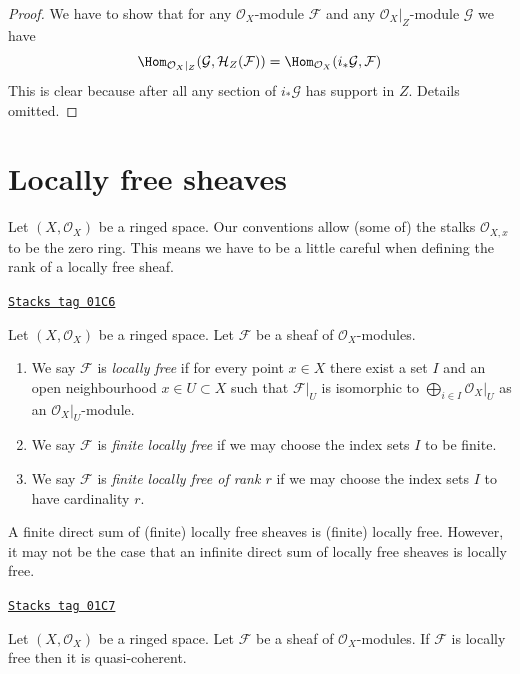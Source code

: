 \begin{proof}
We have to show that for any $\mathcal{O}_X$-module $\mathcal{F}$
and any $\mathcal{O}_X|_Z$-module $\mathcal{G}$ we have
$$
\Hom_{\mathcal{O}_X|_Z}(\mathcal{G}, \mathcal{H}_Z(\mathcal{F})) =
\Hom_{\mathcal{O}_X}(i_*\mathcal{G}, \mathcal{F})
$$
This is clear
because after all any section of $i_*\mathcal{G}$ has support in $Z$.
Details omitted.
\end{proof}

\section{Locally free sheaves}
\label{modules-section-locally-free}
Let $(X, \mathcal{O}_X)$ be a ringed space.
Our conventions allow (some of) the stalks $\mathcal{O}_{X, x}$
to be the zero ring. This means we have to be a little careful
when defining the rank of a locally free sheaf.

\begin{definition}
\label{modules-definition-locally-free}
\href{https://stacks.math.columbia.edu/tag/01C6}{\texttt{Stacks tag 01C6}}

Let $(X, \mathcal{O}_X)$ be a ringed space.
Let $\mathcal{F}$ be a sheaf of $\mathcal{O}_X$-modules.
\begin{enumerate}
\item We say $\mathcal{F}$ is {\it locally free} if for every
point $x \in X$ there exist a set $I$ and an open
neighbourhood $x \in U \subset X$
such that $\mathcal{F}|_U$ is isomorphic to
$\bigoplus_{i \in I} \mathcal{O}_X|_U$ as an $\mathcal{O}_X|_U$-module.
\item We say $\mathcal{F}$ is {\it finite locally free} if we may
choose the index sets $I$ to be finite.
\item We say $\mathcal{F}$ is {\it finite locally free of rank $r$}
if we may choose the index sets $I$ to have cardinality $r$.
\end{enumerate}
\end{definition}

A finite direct sum of (finite) locally free sheaves is (finite)
locally free. However, it may not be the case that an infinite direct
sum of locally free sheaves is locally free.

\begin{lemma}
\label{modules-lemma-locally-free-quasi-coherent}
\href{https://stacks.math.columbia.edu/tag/01C7}{\texttt{Stacks tag 01C7}}

Let $(X, \mathcal{O}_X)$ be a ringed space.
Let $\mathcal{F}$ be a sheaf of $\mathcal{O}_X$-modules.
If $\mathcal{F}$ is locally free then it is quasi-coherent.
\end{lemma}

